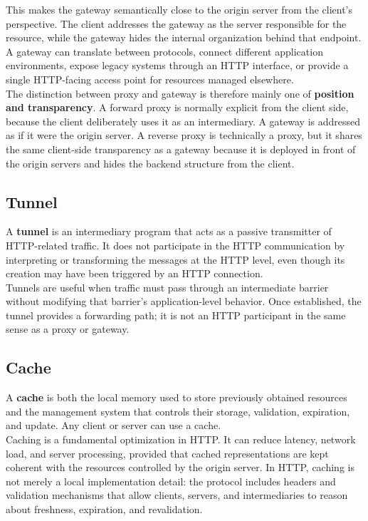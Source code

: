 \documentclass{scrbook}
\begin{document}
This makes the gateway semantically close to the origin server from the client's perspective. The client addresses the gateway as the server responsible for the resource, while the gateway hides the internal organization behind that endpoint. A gateway can translate between protocols, connect different application environments, expose legacy systems through an HTTP interface, or provide a single HTTP-facing access point for resources managed elsewhere.\\

The distinction between proxy and gateway is therefore mainly one of \textbf{position and transparency}. A forward proxy is normally explicit from the client side, because the client deliberately uses it as an intermediary. A gateway is addressed as if it were the origin server. A reverse proxy is technically a proxy, but it shares the same client-side transparency as a gateway because it is deployed in front of the origin servers and hides the backend structure from the client.

\subsection{Tunnel}

A \textbf{tunnel} is an intermediary program that acts as a passive transmitter of HTTP-related traffic. It does not participate in the HTTP communication by interpreting or transforming the messages at the HTTP level, even though its creation may have been triggered by an HTTP connection.\\

Tunnels are useful when traffic must pass through an intermediate barrier without modifying that barrier's application-level behavior. Once established, the tunnel provides a forwarding path; it is not an HTTP participant in the same sense as a proxy or gateway.

\subsection{Cache}

A \textbf{cache} is both the local memory used to store previously obtained resources and the management system that controls their storage, validation, expiration, and update. Any client or server can use a cache.\\

Caching is a fundamental optimization in HTTP. It can reduce latency, network load, and server processing, provided that cached representations are kept coherent with the resources controlled by the origin server. In HTTP, caching is not merely a local implementation detail: the protocol includes headers and validation mechanisms that allow clients, servers, and intermediaries to reason about freshness, expiration, and revalidation.
\end{document}
